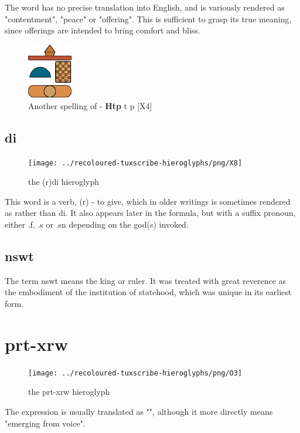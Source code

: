 The word  has no precise translation into English, and is variously rendered as "contentment", "peace" or "offering". This is sufficient to grasp its true meaning, since offerings are intended to bring comfort and bliss.

\begin{figure} [H]
	\centering
	\includegraphics[width=0.175\textwidth]{../images/htp2}
	\caption{Another spelling of  - \textbf{Htp} t p [X4]}
\end{figure}

\subsection*{di}

\begin{figure} [H]
	\centering
	\texttt{[image: ../recoloured-tuxscribe-hieroglyphs/png/X8]}
	\caption{the (r)di hieroglyph}
\end{figure}

This word is a verb, (r) - to give, which in older writings is sometimes rendered as  rather than di. It also appears later in the formula, but with a suffix pronoun, either .f, .s or .sn depending on the god(s) invoked.

\subsection*{nswt}

The term nswt means the king or ruler. It was treated with great reverence as the embodiment of the institution of statehood, which was unique in its earliest form.

\section*{prt-xrw}

\begin{figure} [H]
	\centering
	\texttt{[image: ../recoloured-tuxscribe-hieroglyphs/png/O3]}
	\caption{the prt-xrw hieroglyph}
\end{figure}

The expression  is usually translated as "", although it more directly means "emerging from voice".

